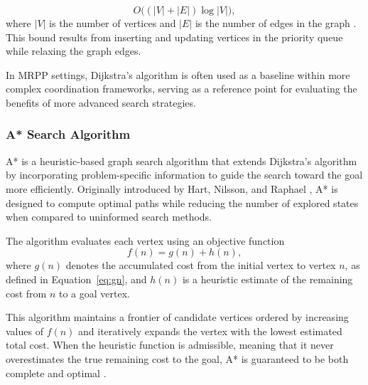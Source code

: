 \begin{equation}
\label{eq:dijkstra_complexity}
    O\bigl((|V| + |E|)\log |V|\bigr),
\end{equation}
where \(|V|\) is the number of vertices and \(|E|\) is the number of edges in the graph \cite{cormen2009introduction}. This bound results from inserting and updating vertices in the priority queue while relaxing the graph edges.

In MRPP settings, Dijkstra's algorithm is often used as a baseline within more complex coordination
frameworks, serving as a reference point for evaluating the benefits of more advanced search
strategies.



\subsubsection{A* Search Algorithm}
\label{subsubsec:astar_search_algorithm}
\hspace{\parindent}
A* is a heuristic-based graph search algorithm that extends Dijkstra's algorithm by
incorporating problem-specific information to guide the search toward the goal more efficiently.
Originally introduced by Hart, Nilsson, and Raphael \cite{hart1968formal}, A* is designed to
compute optimal paths while reducing the number of explored states when compared to uninformed
search methods.

The algorithm evaluates each vertex using an objective function
\begin{equation}
f(n) = g(n) + h(n),
\end{equation}
where $g(n)$ denotes the accumulated cost from the initial vertex to vertex $n$, as defined in
Equation~\eqref{eq:gn}, and $h(n)$ is a heuristic estimate of the remaining cost from $n$ to a
goal vertex.


This algorithm maintains a frontier of candidate vertices ordered by increasing values of 
$f(n)$ and iteratively expands the vertex with the lowest estimated total cost. When the heuristic
function is admissible, meaning that it never overestimates the true remaining cost to the
goal, A* is guaranteed to be both complete and optimal \cite{hart1968formal, pearl1984heuristics}. 


